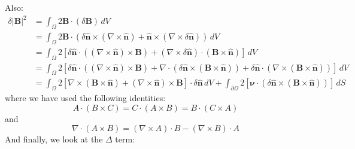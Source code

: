 \documentclass[reqno]{article}
\newcommand{\n}{\hat{\mathbf{n}}}
\begin{document}
Also:
\begin{equation}
\begin{split}
    \delta \left|\mathbf{B}\right|^2
    &=
    \int_{\Omega} 2 \mathbf{B} \cdot \left(\delta \mathbf{B}\right) \, dV \\
    &=
    \int_{\Omega} 2 \mathbf{B} \cdot \left(
        \delta \n \times \left(\nabla \times \n\right)
        + \n \times\left( \nabla \times \delta \n \right)
    \right) \, dV \\
    &=
    \int_{\Omega} 2 \left[ 
        \delta \n \cdot \left( \left( \nabla \times \n \right) \times \mathbf{B}\right)
        + \left(\nabla \times \delta \n \right) \cdot \left(\mathbf{B} \times \n \right)
    \right] \, dV \\
    &=
    \int_{\Omega} 2 \left[ 
        \delta \n \cdot \left( \left( \nabla \times \n \right) \times \mathbf{B}\right)
        + \nabla \cdot \left( \delta \n \times \left( \mathbf{B} \times \n \right) \right)
        + \delta \n \cdot \left( \nabla \times \left( \mathbf{B} \times \n \right) \right)
    \right]  \, dV \\
    &=
    \int_{\Omega} 2 \left[ 
        \nabla \times \left( \mathbf{B} \times \n \right)
        + \left(\nabla \times \n \right) \times \mathbf{B}
    \right] \cdot \delta \n \, dV
    +
    \int_{\partial \Omega} 2 \left[
        \boldsymbol\nu \cdot \left( \delta \n \times \left( \mathbf{B} \times \n \right) \right)
    \right] \, dS
\end{split}
\end{equation}
where we have used the following identities:
\begin{equation}
    A \cdot (B \times C)
    =
    C \cdot (A \times B)
    =
    B \cdot (C \times A)
\end{equation}
and
\begin{equation}
    \nabla \cdot (A \times B)
    =
    (\nabla \times A) \cdot B
    - (\nabla \times B) \cdot A
\end{equation}
And finally, we look at the $\Delta$ term:
\end{document}

